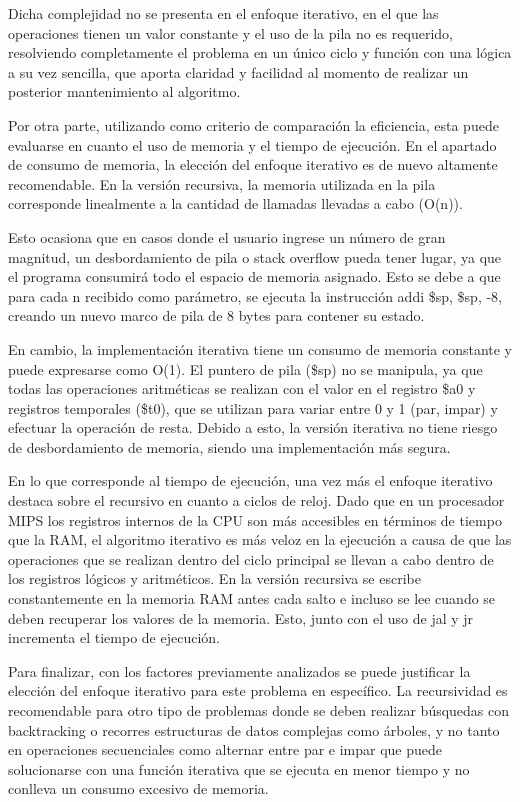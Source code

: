 \documentclass[12pt, letterpaper]{article}
\begin{document}
Dicha complejidad no se presenta en el enfoque iterativo, en el que las operaciones tienen un valor constante y el uso de la pila no es requerido, resolviendo completamente el problema en un único ciclo y función con una lógica a su vez sencilla, que aporta claridad y facilidad al momento de realizar un posterior mantenimiento al algoritmo. 

Por otra parte, utilizando como criterio de comparación la eficiencia, esta puede evaluarse en cuanto el uso de memoria y el tiempo de ejecución. En el apartado de consumo de memoria, la elección del enfoque iterativo es de nuevo altamente recomendable. En la versión recursiva, la memoria utilizada en la pila corresponde linealmente a la cantidad de llamadas llevadas a cabo (O(n)). 

Esto ocasiona que en casos donde el usuario ingrese un número de gran magnitud, un desbordamiento de pila o stack overflow pueda tener lugar, ya que el programa consumirá todo el espacio de memoria asignado. Esto se debe a que para cada n recibido como parámetro, se ejecuta la instrucción addi \$sp, \$sp, -8, creando un nuevo marco de pila de 8 bytes para contener su estado. 

En cambio, la implementación iterativa tiene un consumo de memoria constante y puede expresarse como O(1). El puntero de pila (\$sp) no se manipula, ya que todas las operaciones aritméticas se realizan con el valor en el registro \$a0 y registros temporales (\$t0), que se utilizan para variar entre 0 y 1 (par, impar) y efectuar la operación de resta. Debido a esto, la versión iterativa no tiene riesgo de desbordamiento de memoria, siendo una implementación más segura. 

En lo que corresponde al tiempo de ejecución, una vez más el enfoque iterativo destaca sobre el recursivo en cuanto a ciclos de reloj. Dado que en un procesador MIPS los registros internos de la CPU son más accesibles en términos de tiempo que la RAM, el algoritmo iterativo es más veloz en la ejecución a causa de que las operaciones que se realizan dentro del ciclo principal se llevan a cabo dentro de los registros lógicos y aritméticos. En la versión recursiva se escribe constantemente en la memoria RAM antes cada salto e incluso se lee cuando se deben recuperar los valores de la memoria. Esto, junto con el uso de jal y jr incrementa el tiempo de ejecución. 

Para finalizar, con los factores previamente analizados se puede justificar la elección del enfoque iterativo para este problema en específico. La recursividad es recomendable para otro tipo de problemas donde se deben realizar búsquedas con backtracking o recorres estructuras de datos complejas como árboles, y no tanto en operaciones secuenciales como alternar entre par e impar que puede solucionarse con una función iterativa que se ejecuta en menor tiempo y no conlleva un consumo excesivo de memoria.
\end{document}
